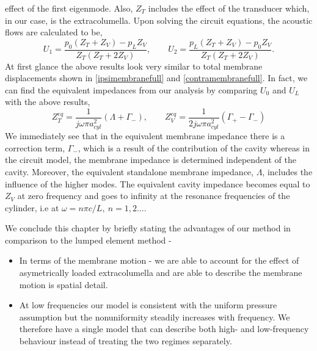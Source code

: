 effect of the first eigenmode. Also, $Z_T$ includes the effect of the transducer which, in our case, is the extracolumella. Upon solving the circuit equations, the acoustic flows are calculated to be,
\begin{equation}
 U_1=\frac{p_0(Z_T+Z_V)-p_LZ_V}{Z_T(Z_T+2Z_V)},\qquad U_2=\frac{p_L(Z_T+Z_V)-p_0Z_V}{Z_T(Z_T+2Z_V)}.
\end{equation}
At first glance the above results look very similar to total membrane displacements shown in \eqref{ipsimembranefull} and \eqref{contramembranefull}.
In fact, we can find the equivalent impedances from our analysis by comparing $U_0$ and $U_L$ with the above results,
\begin{equation}
 Z^{eq}_T=\frac{1}{j\omega\pi a^2_{cyl}}(\Lambda+\Gamma_-),\qquad Z^{eq}_V=\frac{1}{2j\omega\pi a^2_{cyl}}(\Gamma_+-\Gamma_-)
\end{equation}
We immediately see that in the equivalent membrane impedance there is a correction term, $\Gamma_-$, which is a result of the contribution of the cavity whereas in 
the circuit model, the membrane impedance is determined independent of the cavity. Moreover, the equivalent standalone membrane impedance, $\Lambda$,
includes the influence of the higher modes. The equivalent cavity impedance becomes equal to $Z_V$ at zero frequency and goes to infinity at the
resonance frequencies of the cylinder, i.e at $\omega=n\pi c/L,\ n=1,2\ldots$.
% 
\vspace{\baselineskip}

\noindent We conclude this chapter by briefly stating the advantages of our method in comparison to the lumped element method - 
\begin{itemize}
 \item In terms of the membrane motion - we are able to account for the effect of asymetrically loaded extracolumella and are able to describe the membrane motion is spatial detail.
 \item At low frequencies our model is consistent with the uniform pressure assumption but the nonuniformity steadily increases with frequency.
  We therefore have a single model that can describe both high- and low-frequency behaviour instead of treating the two regimes separately.
\end{itemize}

